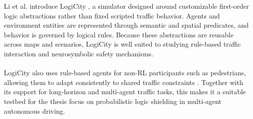 Li et al. introduce LogiCity \cite{li2025logicityadvancingneurosymbolicai}, a simulator designed around customizable first-order logic abstractions rather than fixed scripted traffic behavior. Agents and environment entities are represented through semantic and spatial predicates, and behavior is governed by logical rules. Because these abstractions are reusable across maps and scenarios, LogiCity is well suited to studying rule-based traffic interaction and neurosymbolic safety mechanisms.
\\
\\
LogiCity also uses rule-based agents for non-RL participants such as pedestrians, allowing them to adapt consistently to shared traffic constraints \cite{li2025logicityadvancingneurosymbolicai}. Together with its support for long-horizon and multi-agent traffic tasks, this makes it a suitable testbed for the thesis focus on probabilistic logic shielding in multi-agent autonomous driving.




